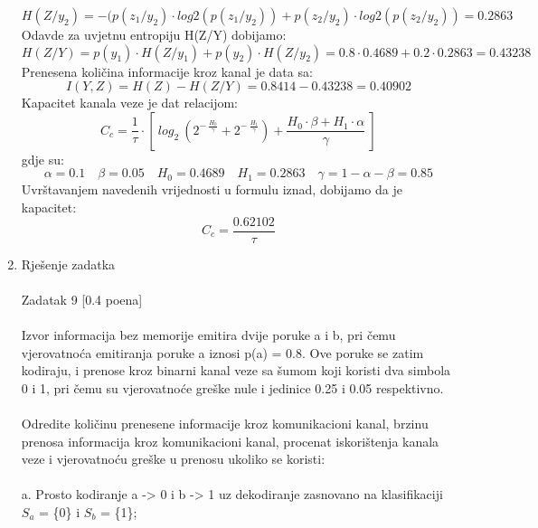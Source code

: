 \documentclass[12pt]{article}
\begin{document}
\begin{enumerate}
\begin{equation*}
\end{equation*}
\begin{equation*}
    H(Z/y_2) = -(p(z_1/y_2) \cdot log2(p(z_1/y_2)) + p(z_2/y_2) \cdot log2(p(z_2/y_2)) = 0.2863
\end{equation*}
Odavde za uvjetnu entropiju H(Z/Y) dobijamo:
\begin{equation*}
    H(Z/Y) = p(y_1) \cdot H(Z/y_1) + p(y_2) \cdot H(Z/y_2) = 0.8\cdot0.4689 + 0.2\cdot0.2863 = 0.43238
\end{equation*}
Prenesena količina informacije kroz kanal je data sa:
\begin{equation*}
    I(Y,Z) = H(Z) - H(Z/Y) = 0.8414 - 0.43238 = 0.40902
\end{equation*}
    Kapacitet kanala veze je dat relacijom:
    \begin{equation*}
        C_c = \frac{1}{\tau} \cdot [~log_2~(2^{-~\frac{H_0}{\gamma}} + 2^{-~\frac{H_1}{\gamma}}) + \frac{H_0 \cdot \beta + H_1 \cdot \alpha}{\gamma}~]
    \end{equation*}
    gdje su:
    \begin{equation*}
        \alpha = 0.1 \quad \beta = 0.05 \quad H_0 = 0.4689\quad H_1 = 0.2863 \quad \gamma = 1 - \alpha - \beta = 0.85
    \end{equation*}
    Uvrštavanjem navedenih vrijednosti u formulu iznad, dobijamo da je kapacitet:
    \begin{equation*}
        C_c = \frac{0.62102}{\tau}
    \end{equation*}
		\item Rješenje zadatka \\
		\\
		Zadatak 9 [0.4 poena]
        \\
        \\
Izvor informacija bez memorije emitira dvije poruke a i b, pri čemu vjerovatnoća emitiranja poruke a iznosi p(a) = 0.8. Ove poruke se zatim kodiraju, i prenose kroz binarni kanal veze sa šumom koji koristi dva simbola 0 i 1, pri čemu su vjerovatnoće greške nule i jedinice 0.25 i 0.05 respektivno.
\\
\\
Odredite količinu prenesene informacije kroz komunikacioni kanal, brzinu prenosa informacija kroz komunikacioni kanal, procenat iskorištenja kanala veze i vjerovatnoću greške u prenosu ukoliko se koristi: \\
\\
a. Prosto kodiranje a -> 0 i b -> 1 uz dekodiranje zasnovano na klasifikaciji $S_a$ = \{0\} i $S_b$ = \{1\}; \\

\end{enumerate}
\end{document}
